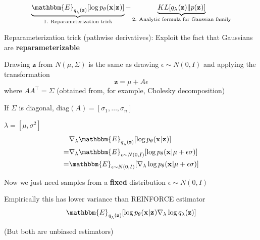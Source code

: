 \documentclass{beamer}
\let\tempone\itemize
\let\temptwo\enditemize
\renewenvironment{itemize}{\tempone\addtolength{\itemsep}{0.5\baselineskip}}{\temptwo}
\newcommand{\zvec}{\mathbf{z}}
\newcommand{\E}{\mathbbm{E}}
\newcommand{\xvec}{\mathbf{x}}
\begin{document}
\begin{frame}
  \begin{center}
   \end{center}

\[ \underbrace{\E_{q_\lambda^{}(\zvec)}[\log  p_\theta(\xvec^{} | \zvec^{})]}_{\text{1. Reparameterization trick}} - \underbrace{KL[q_{\lambda^{}}(\zvec) \Vert p(\zvec^{})]}_{\text{2. Analytic formula for Gaussian family}} \]
\begin{itemize}
\item Reparameterization trick (pathwise derivatives): Exploit the fact that Gaussians are \textbf{reparameterizable}
\item Drawing $\zvec$ from $N(\mu, \Sigma)$ is the same as drawing $\epsilon \sim N(0,I)$ 
and applying the transformation
\[ \zvec = \mu + A\epsilon \]
where $AA^\top = \Sigma$ (obtained from, for example, Cholesky decomposition)
\item If $\Sigma$ is diagonal, $\text{diag}(A)  = [\sigma_1, \dots, \sigma_n]$
\end{itemize}
\end{frame}

\begin{frame}
  \begin{center}
   \end{center}
$\lambda = [\mu, \sigma^2]$
\begin{align*}
&\nabla_\lambda \E_{q_\lambda^{}(\zvec)}[\log  p_\theta(\xvec^{} | \zvec^{})] \\
=& \nabla_\lambda \E_{\epsilon \sim N(0,I)}[\log  p_\theta(\xvec^{} | \mu + \epsilon \sigma  )] \\
=& \E_{\epsilon \sim N(0,I)}[\nabla_\lambda \log  p_\theta(\xvec^{} | \mu + \epsilon \sigma  )] 
\end{align*}
\begin{itemize}
\item Now we just need samples from a \textbf{fixed} distribution $\epsilon \sim N(0, I)$
\item Empirically this has lower variance than REINFORCE estimator
\[ \E_{q_\lambda^{}(\zvec)}[\log  p_\theta(\xvec^{} | \zvec^{})\nabla_\lambda \log q_\lambda (\zvec)] \]
\item (But both are unbiased estimators)
\end{itemize}
\end{frame}
\end{document}
